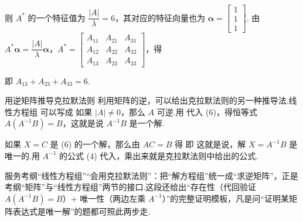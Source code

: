 则 $A^{*}$ 的一个特征值为 $\dfrac{|A|}{\lambda}=6$，其对应的特征向量也为 $\boldsymbol{\alpha}=\begin{bmatrix}1\\1\\1\end{bmatrix}$. 由 $A^{*}\boldsymbol{\alpha}=\dfrac{|A|}{\lambda}\boldsymbol{\alpha}$，$A^{*}=\begin{bmatrix}A_{11}&A_{21}&A_{31}\\A_{12}&A_{22}&A_{32}\\A_{13}&A_{23}&A_{33}\end{bmatrix}$，得

即 $A_{13}+A_{23}+A_{33}=6$.




\begin{fdeep}{用逆矩阵推导克拉默法则}
利用矩阵的逆，可以给出克拉默法则的另一种推导法.线性方程组
可以写成
如果 $|A|\ne 0$，那么 $A$ 可逆.用
代入 (6)，得恒等式 $A(A^{-1}B)=B$，这就是说 $A^{-1}B$ 是一个解.

如果 $X=C$ 是 (6) 的一个解，那么由 $AC=B$ 得
即
这就是说，解 $X=A^{-1}B$ 是唯一的.用 $A^{-1}$ 的公式 (4) 代入，乘出来就是克拉默法则中给出的公式.

\fbref{}服务考纲“线性方程组”“会用克拉默法则”：把“解方程组”统一成“求逆矩阵”，正是考纲“矩阵”与“线性方程组”两节的接口.这段还给出“存在性（代回验证 $A(A^{-1}B)=B$）$+$ 唯一性（两边左乘 $A^{-1}$）”的完整证明模板，凡是问“证明某矩阵表达式是唯一解”的题都可照此两步走.
\end{fdeep}

